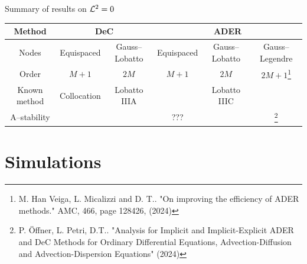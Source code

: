 \documentclass[9pt,compress,t,aspectratio=169]{beamer}
\newcommand{\bad}{\Sadey[2][red]}
\newcommand{\good}{\Smiley[2][green]}
\begin{document}
\begin{frame}[c]{Summary of results on $\mathcal{L}^2=0$}
		\centering
	
	\begin{tabular}{|c||c|c||c|c|c|} \hline
		Method & \multicolumn{2}{c||}{DeC} & \multicolumn{3}{c|}{ADER}\\ \hline 
		Nodes & Equispaced & Gauss--Lobatto & Equispaced & Gauss--Lobatto & Gauss--Legendre\\ \hline \hline
		Order & $M+1$ & $2M$ & $M+1$ & $2M$ & $2M+1$\footnote{M. Han Veiga, L. Micalizzi and D. T.. "On improving the efficiency of ADER methods." AMC, 466, page 128426, (2024)}\\ \hline
		Known method & Collocation & Lobatto IIIA & & Lobatto IIIC & \\\hline
		A--stability & \bad & \good & ??? & \good & \good \footnote{P. \"Offner, L. Petri, D.T.. "Analysis for Implicit and Implicit-Explicit ADER and DeC
			Methods for Ordinary Differential Equations, Advection-Diffusion
			and Advection-Dispersion Equations" (2024)} \\ \hline 		
	\end{tabular}
\end{frame}


\section{Simulations}
\end{document}
